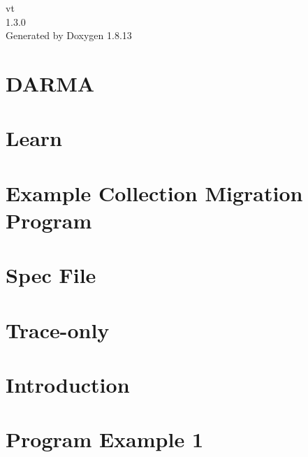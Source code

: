 \documentclass[twoside]{book}
\newcommand{\+}{\discretionary{\mbox{\scriptsize$\hookleftarrow$}}{}{}}
\newcommand{\clearemptydoublepage}{%
  \newpage{\pagestyle{empty}\cleardoublepage}%
}
\begin{document}
\hypersetup{pageanchor=false,
             bookmarksnumbered=true,
             pdfencoding=unicode
            }
\begin{titlepage}
\vspace*{7cm}
\begin{center}%
{\Large vt \\[1ex]\large 1.\+3.\+0 }\\
\vspace*{1cm}
{\large Generated by Doxygen 1.8.13}\\
\end{center}
\end{titlepage}
\clearemptydoublepage
{}
\tableofcontents
\clearemptydoublepage
{}
\hypersetup{pageanchor=true}

\chapter{D\+A\+R\+MA}
\label{index}\hypertarget{index}{}
\chapter{Learn}
\label{learn}

\chapter{Example Collection Migration Program}
\label{migrate-collection-example}

\chapter{Spec File}
\label{spec-file}

\chapter{Trace-\/only}
\label{trace-only}

\chapter{Introduction}
\label{introduction}

\chapter{Program Example 1}
\label{ckpt_learn_ex1}

\end{document}

